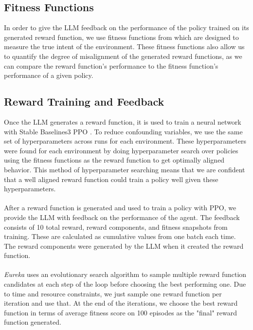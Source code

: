 \documentclass[11pt]{article}
\begin{document}
\subsection{Fitness Functions}
In order to give the LLM feedback on the performance of the policy trained on its generated reward function, we use fitness functions from \cite{leike2017aisafetygridworlds} which are designed to measure the true intent of the environment.
These fitness functions also allow us to quantify the degree of misalignment of the generated reward functions, as we can compare the reward function's performance to the fitness function's performance of a given policy.

\subsection{Reward Training and Feedback}
Once the LLM generates a reward function, it is used to train a neural network with Stable Baselines3 PPO \cite{raffin2021sb3blog}. To reduce confounding variables, we use the same set of hyperparameters across runs for each environment. These hyperparameters were
found for each environment by doing hyperparameter search over policies using the fitness functions as the reward function to get optimally aligned behavior. This method of hyperparameter searching means that we are confident that a well aligned reward function
could train a policy well given these hyperparameters.
\\\\
After a reward function is generated and used to train a policy with PPO, we provide the LLM with feedback on the performance of the agent. The feedback consists of 10 total reward, reward components, and fitness snapshots from training.
These are calculated as cumulative values from one batch each time. The reward components were generated by the LLM when it created the reward function. 
\\\\
\textit{Eureka} uses an evolutionary search algorithm to sample multiple reward function candidates at each step of the loop before choosing the best performing one. 
Due to time and resource constraints, we just sample one reward function per iteration and use that. At the end of the iterations, we choose the best reward function in terms of average fitness score
on 100 episodes as the "final" reward function generated.
\end{document}
